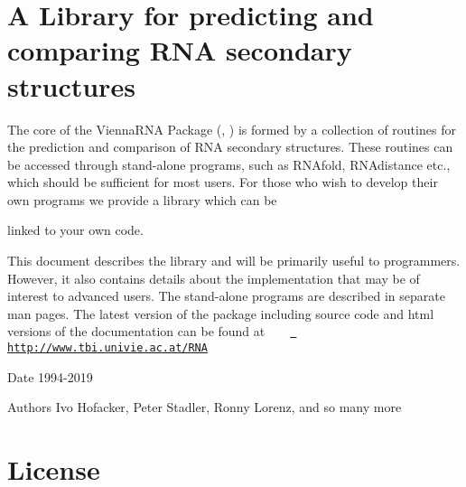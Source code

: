 \hypertarget{index_introduction}{}\section{A Library for predicting and comparing R\+N\+A secondary structures}\label{index_introduction}
The core of the Vienna\+R\+NA Package (\cite{lorenz:2011}, \cite{hofacker:1994}) is formed by a collection of routines for the prediction and comparison of R\+NA secondary structures. These routines can be accessed through stand-\/alone programs, such as {\ttfamily R\+N\+Afold}, {\ttfamily R\+N\+Adistance} etc., which should be sufficient for most users. For those who wish to develop their own programs we provide a library which can be

linked to your own code.

This document describes the library and will be primarily useful to programmers. However, it also contains details about the implementation that may be of interest to advanced users. The stand-\/alone programs are described in separate man pages. The latest version of the package including source code and html versions of the documentation can be found at ~\newline
~\newline
 \href{http://www.tbi.univie.ac.at/RNA}{\texttt{ http\+://www.\+tbi.\+univie.\+ac.\+at/\+R\+NA}}

\begin{DoxyDate}{Date}
1994-\/2019 
\end{DoxyDate}
\begin{DoxyAuthor}{Authors}
Ivo Hofacker, Peter Stadler, Ronny Lorenz, and so many more
\end{DoxyAuthor}
\hypertarget{index_license}{}\section{License}\label{index_license}

